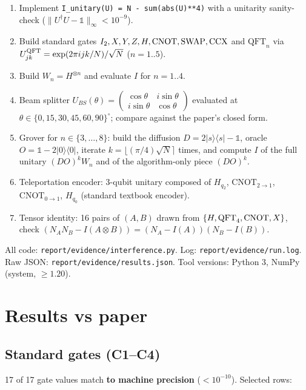 \documentclass[11pt]{article}
\begin{document}
\begin{enumerate}
\item Implement \texttt{I\_unitary(U) = N - sum(abs(U)**4)} with a unitarity
      sanity-check ($\|U^\dagger U - \mathbb{1}\|_\infty < 10^{-9}$).
\item Build standard gates $I_2, X, Y, Z, H, {\rm CNOT}, {\rm SWAP}, {\rm CCX}$
      and $\text{QFT}_n$ via
      $U^{\rm QFT}_{jk} = \exp(2\pi i jk/N)/\sqrt N$ ($n=1..5$).
\item Build $W_n = H^{\otimes n}$ and evaluate $I$ for $n=1..4$.
\item Beam splitter $U_{BS}(\theta) = \left(\begin{smallmatrix}\cos\theta & i\sin\theta\\ i\sin\theta & \cos\theta\end{smallmatrix}\right)$ evaluated at $\theta \in \{0,15,30,45,60,90\}^\circ$; compare against the paper's closed form.
\item Grover for $n \in \{3,\ldots,8\}$: build the diffusion $D = 2|s\rangle\langle s| - \mathbb{1}$, oracle $O = \mathbb{1} - 2|0\rangle\langle 0|$, iterate $k = \lfloor (\pi/4)\sqrt N\rceil$ times, and compute $I$ of the full unitary $(DO)^k W_n$ and of the algorithm-only piece $(DO)^k$.
\item Teleportation encoder: 3-qubit unitary composed of $H_{q_2}$, $\mathrm{CNOT}_{2\to 1}$, $\mathrm{CNOT}_{0\to 1}$, $H_{q_0}$ (standard textbook encoder).
\item Tensor identity: 16 pairs of $(A,B)$ drawn from $\{H, {\rm QFT}_4, {\rm CNOT}, X\}$, check
      $(N_A N_B - I(A\otimes B)) = (N_A - I(A))(N_B - I(B))$.
\end{enumerate}

\noindent All code: \verb|report/evidence/interference.py|. Log:
\verb|report/evidence/run.log|. Raw JSON: \verb|report/evidence/results.json|.
Tool versions: Python 3, NumPy (system, $\ge 1.20$).

\section{Results vs paper}

\subsection{Standard gates (C1--C4)}

17 of 17 gate values match \textbf{to machine precision} ($< 10^{-10}$). Selected rows:
\end{document}
